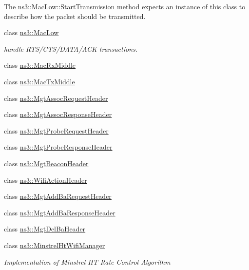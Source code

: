 \begin{DoxyCompactItemize}
\begin{DoxyCompactList}
The \hyperlink{classns3_1_1MacLow_a3d13643c758e213041f8389c1041074b}{ns3\+::\+Mac\+Low\+::\+Start\+Transmission} method expects an instance of this class to describe how the packet should be transmitted. \end{DoxyCompactList}\item 
class \hyperlink{classns3_1_1MacLow}{ns3\+::\+Mac\+Low}
\begin{DoxyCompactList}\small\item\em handle R\+T\+S/\+C\+T\+S/\+D\+A\+T\+A/\+A\+CK transactions. \end{DoxyCompactList}\item 
class \hyperlink{classns3_1_1MacRxMiddle}{ns3\+::\+Mac\+Rx\+Middle}
\item 
class \hyperlink{classns3_1_1MacTxMiddle}{ns3\+::\+Mac\+Tx\+Middle}
\item 
class \hyperlink{classns3_1_1MgtAssocRequestHeader}{ns3\+::\+Mgt\+Assoc\+Request\+Header}
\item 
class \hyperlink{classns3_1_1MgtAssocResponseHeader}{ns3\+::\+Mgt\+Assoc\+Response\+Header}
\item 
class \hyperlink{classns3_1_1MgtProbeRequestHeader}{ns3\+::\+Mgt\+Probe\+Request\+Header}
\item 
class \hyperlink{classns3_1_1MgtProbeResponseHeader}{ns3\+::\+Mgt\+Probe\+Response\+Header}
\item 
class \hyperlink{classns3_1_1MgtBeaconHeader}{ns3\+::\+Mgt\+Beacon\+Header}
\item 
class \hyperlink{classns3_1_1WifiActionHeader}{ns3\+::\+Wifi\+Action\+Header}
\item 
class \hyperlink{classns3_1_1MgtAddBaRequestHeader}{ns3\+::\+Mgt\+Add\+Ba\+Request\+Header}
\item 
class \hyperlink{classns3_1_1MgtAddBaResponseHeader}{ns3\+::\+Mgt\+Add\+Ba\+Response\+Header}
\item 
class \hyperlink{classns3_1_1MgtDelBaHeader}{ns3\+::\+Mgt\+Del\+Ba\+Header}
\item 
class \hyperlink{classns3_1_1MinstrelHtWifiManager}{ns3\+::\+Minstrel\+Ht\+Wifi\+Manager}
\begin{DoxyCompactList}\small\item\em Implementation of Minstrel HT Rate Control Algorithm


\end{DoxyCompactList}
\end{DoxyCompactItemize}
